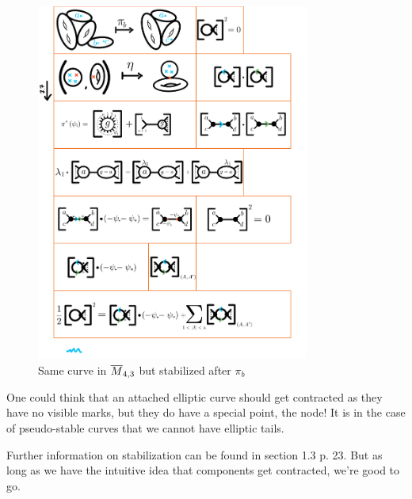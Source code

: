 \documentclass[12pt]{memoir}
\begin{document}
\begin{Ex}
\begin{figure}[h!]
        \centering
        \includegraphics[width=0.8\textwidth, trim= 1.3cm 24.6cm 9cm 0.1cm,clip]{../figs/FigsDNnotability2.pdf}
        \caption{Same curve in $\overline M_{4,3}$ but stabilized after $\pi_b$}
        \label{fig:forget-mark-in-tail}
    \end{figure}
\end{Ex}

\begin{Rmk}
    One could think that an attached elliptic curve should get contracted as they have no visible marks, but they do have a special point, the node! It is in the case of pseudo-stable curves that we cannot have elliptic tails.
\end{Rmk}

Further information on stabilization can be found in \cite{GreenBookKockVainsencher} section 1.3 p. 23. But as long as we have the intuitive idea that components get contracted, we're good to go.
\end{document}
